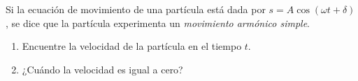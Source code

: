 \item Si la ecuación de movimiento de una partícula está dada por $s = A \cos(\omega t + \delta)$, se dice que la partícula experimenta un \textit{movimiento armónico simple}.
\begin{enumerate}
    \item[(a)] Encuentre la velocidad de la partícula en el tiempo $t$.
    \item[(b)] ¿Cuándo la velocidad es igual a cero?
\end{enumerate}
